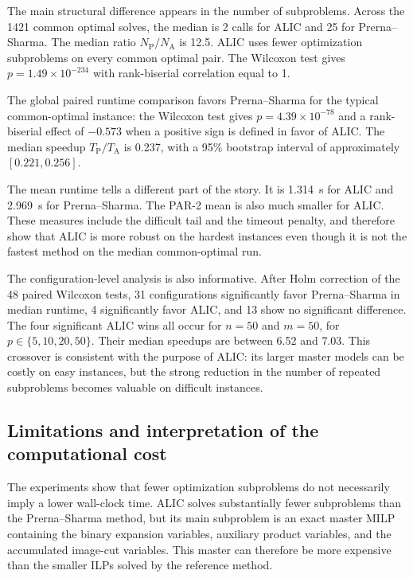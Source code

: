 The main structural difference appears in the number of subproblems.
Across the 1421 common optimal solves, the median is 2 calls for ALIC and
25 for Prerna--Sharma. The median ratio
$N_{\mathrm{P}}/N_{\mathrm{A}}$ is 12.5. ALIC uses fewer optimization
subproblems on every common optimal pair. The Wilcoxon test gives
$p=1.49\times10^{-234}$ with rank-biserial correlation equal to 1.

The global paired runtime comparison favors Prerna--Sharma for the typical
common-optimal instance: the Wilcoxon test gives
$p=4.39\times10^{-78}$ and a rank-biserial effect of $-0.573$ when a
positive sign is defined in favor of ALIC. The median speedup
$T_{\mathrm{P}}/T_{\mathrm{A}}$ is 0.237, with a 95\% bootstrap interval
of approximately $[0.221,0.256]$.

The mean runtime tells a different part of the story. It is 1.314~s for
ALIC and 2.969~s for Prerna--Sharma. The PAR-2 mean is also much smaller
for ALIC. These measures include the difficult tail and the timeout
penalty, and therefore show that ALIC is more robust on the hardest
instances even though it is not the fastest method on the median
common-optimal run.

The configuration-level analysis is also informative. After Holm
correction of the 48 paired Wilcoxon tests, 31 configurations
significantly favor Prerna--Sharma in median runtime, 4 significantly
favor ALIC, and 13 show no significant difference. The four significant
ALIC wins all occur for $n=50$ and $m=50$, for
$p\in\{5,10,20,50\}$. Their median speedups are between 6.52 and 7.03.
This crossover is consistent with the purpose of ALIC: its larger master
models can be costly on easy instances, but the strong reduction in the
number of repeated subproblems becomes valuable on difficult instances.

\subsection{Limitations and interpretation of the computational cost}

The experiments show that fewer optimization subproblems do not
necessarily imply a lower wall-clock time. ALIC solves substantially
fewer subproblems than the Prerna--Sharma method, but its main subproblem
is an exact master MILP containing the binary expansion variables,
auxiliary product variables, and the accumulated image-cut variables.
This master can therefore be more expensive than the smaller ILPs solved
by the reference method.

